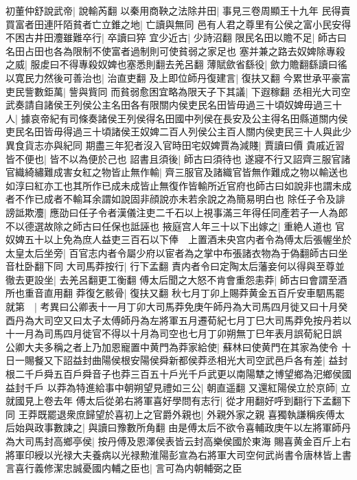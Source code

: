 初董仲舒說武帝|{
	說輸芮翻}
以秦用商鞅之法除井田|{
	事見三卷周顯王十九年}
民得賣買富者田連阡陌貧者亡立錐之地|{
	亡讀與無同}
邑有人君之尊里有公侯之富小民安得不困古井田灋雖難卒行|{
	卒讀曰猝}
宜少近古|{
	少詩沼翻}
限民名田以贍不足|{
	師古曰名田占田也各為限制不使富者過制則可使貧弱之家足也}
塞并兼之路去奴婢除專殺之威|{
	服䖍曰不得專殺奴婢也塞悉則翻去羌呂翻}
薄賦歛省繇役|{
	歛力贍翻繇讀曰徭}
以寛民力然後可善治也|{
	治直吏翻}
及上即位師丹復建言|{
	復扶又翻}
今累世承平豪富吏民訾數鉅萬|{
	訾與貲同}
而貧弱愈困宜略為限天子下其議|{
	下遐稼翻}
丞相光大司空武奏請自諸侯王列侯公主名田各有限關内侯吏民名田皆毋過三十頃奴婢毋過三十人|{
	據哀帝紀有司條奏諸侯王列侯得名田國中列侯在長安及公主得名田縣道關内侯吏民名田皆毋得過三十頃諸侯王奴婢二百人列侯公主百人關内侯吏民三十人與此少異食貨志亦與紀同}
期盡三年犯者沒入官時田宅奴婢賈為減賤|{
	賈讀曰價}
貴戚近習皆不便也|{
	皆不以為便於己也}
詔書且須後|{
	師古曰須待也}
遂寢不行又詔齊三服官諸官織綺繡難成害女紅之物皆止無作輸|{
	齊三服官及諸織官皆無作難成之物以輸送也如淳曰紅亦工也其所作已成未成皆止無復作皆輸所近官府也師古曰如說非也謂未成者不作已成者不輸耳余謂如說固非顔說亦未若余說之為簡易明白也}
除任子令及誹謗詆欺灋|{
	應劭曰任子令者漢儀注吏二千石以上視事滿三年得任同產若子一人為郎不以德選故除之師古曰任保也詆誣也}
掖庭宫人年三十以下出嫁之|{
	重絶人道也}
官奴婢五十以上免為庶人益吏三百石以下俸　上置酒未央宫内者令為傅太后張幄坐於太皇太后坐旁|{
	百官志内者令屬少府以宦者為之掌中布張諸衣物為于偽翻師古曰坐音杜卧翻下同}
大司馬莽按行|{
	行下孟翻}
責内者令曰定陶太后藩妾何以得與至尊並徹去更設坐|{
	去羌呂翻更工衡翻}
傅太后聞之大怒不肯會重怨恚莽|{
	師古曰會謂至酒所也重音直用翻}
莽復乞骸骨|{
	復扶又翻}
秋七月丁卯上賜莽黄金五百斤安車駟馬罷就第　|{
	考異曰公卿表十一月丁卯大司馬莽免庚午師丹為大司馬四月徙又曰十月癸酉丹為大司空又曰太子太傅師丹為左將軍五月遷荀紀七月丁巳大司馬莽免按丹若以十一月為司馬四月徙官不得以十月為司空也七月丁卯朔無丁巳年表月誤荀紀日誤}
公卿大夫多稱之者上乃加恩寵置中黄門為莽家給使|{
	蘇林曰使黄門在其家為使令}
十日一賜餐又下詔益封曲陽侯根安陽侯舜新都侯莽丞相光大司空武邑戶各有差|{
	益封根二千戶舜五百戶舜音子也莽三百五十戶光千戶武更以南陽犨之博望鄉為汜鄉侯國益封千戶}
以莽為特進給事中朝朔望見禮如三公|{
	朝直遥翻}
又還紅陽侯立於京師|{
	立就國見上卷去年}
傅太后從弟右將軍喜好學問有志行|{
	從才用翻好呼到翻行下孟翻下同}
王莽既罷退衆庶歸望於喜初上之官爵外親也|{
	外親外家之親}
喜獨執謙稱疾傅太后始與政事數諫之|{
	與讀曰豫數所角翻}
由是傅太后不欲令喜輔政庚午以左將軍師丹為大司馬封高鄉亭侯|{
	按丹傅及恩澤侯表皆云封高樂侯國於東海}
賜喜黄金百斤上右將軍印綬以光禄大夫養病以光禄勲淮陽彭宣為右將軍大司空何武尚書令唐林皆上書言喜行義修潔忠誠憂國内輔之臣也|{
	言可為内朝輔弼之臣}
